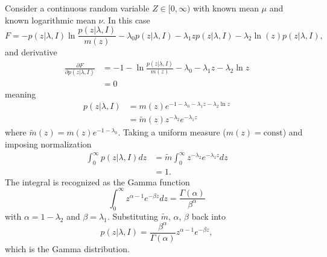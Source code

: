 \begin{example}
	Consider a continuous random variable $Z \in [0,\infty)$ with known mean $\mu$ and known logarithmic mean $\nu$. In this case
	\begin{equation}
		F = - p(z|\lambda,I) \ln \frac{p(z|\lambda,I)}{m(z)} - \lambda_0 p(z|\lambda,I) - \lambda_1 z p(z|\lambda,I) - \lambda_2 \ln(z) p(z|\lambda,I),
	\end{equation}
	and derivative
	\begin{equation}
		\begin{split}
			\frac{\partial F}{\partial p(z|\lambda,I)} &= -1 - \ln\frac{p(z|\lambda,I)}{m(z)} - \lambda_0 - \lambda_1 z - \lambda_2 \ln z\\
			& = 0
		\end{split}
	\end{equation}
	meaning
	\begin{equation}
		\begin{split}
			p(z|\lambda,I)&= m(z) e^{-1-\lambda_0 - \lambda_1 z - \lambda_2 \ln z}\\
			& = \tilde{m}(z)  z^{-\lambda_2} e^{-\lambda_1 z}
		\end{split}
		\label{eq:gam1}
	\end{equation}
	where $\tilde{m}(z) = m(z) e^{-1-\lambda_0}$. Taking a uniform measure ($m(z) = \text{const}$) and imposing normalization
	\begin{equation}
		\begin{split}
			\int_0^\infty p(z|\lambda,I) dz &= \tilde{m} \int_0^\infty z^{-\lambda_2} e^{-\lambda_1 z} dz\\
			& = 1.
		\end{split}
	\end{equation}
	The integral is recognized as the Gamma function
	\begin{equation}
		\int_0^\infty z^{\alpha-1} e^{-\beta z} dz = \frac{\Gamma(\alpha)}{\beta^\alpha}
	\end{equation}
	with $\alpha = 1 - \lambda_2$ and $\beta = \lambda_1$. Substituting $\tilde{m}$, $\alpha$, $\beta$ back into 
	\begin{equation}
		p(z|\lambda,I) = \frac{\beta^\alpha}{\Gamma(\alpha)} z^{\alpha-1} e^{-\beta z},
	\end{equation}
	which is the Gamma distribution.
\end{example}

